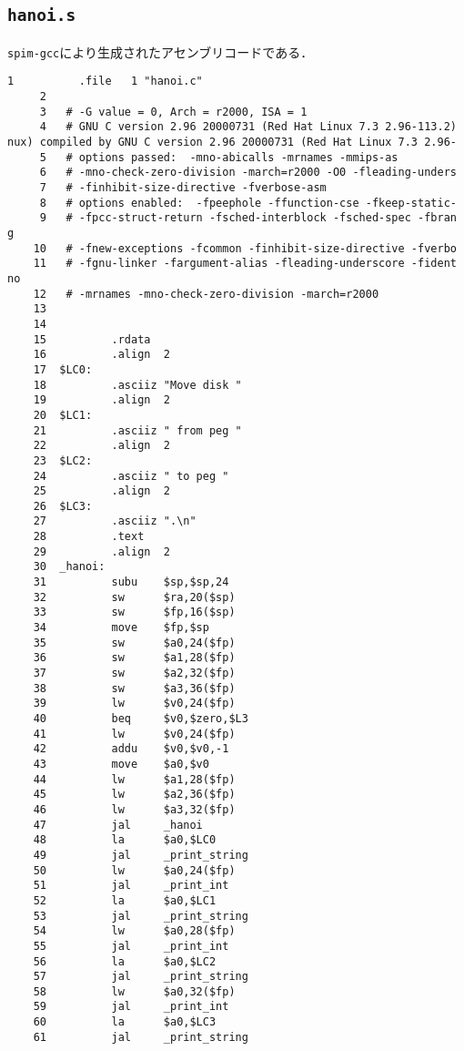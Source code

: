 \subsection{\texttt{hanoi.s}} \label{sec:hanoi.s}
\verb|spim-gcc|により生成されたアセンブリコードである．
\begin{Verbatim}[fontsize=\small, baselinestretch=0.8]
     1          .file   1 "hanoi.c"
     2
     3   # -G value = 0, Arch = r2000, ISA = 1
     4   # GNU C version 2.96 20000731 (Red Hat Linux 7.3 2.96-113.2)
nux) compiled by GNU C version 2.96 20000731 (Red Hat Linux 7.3 2.96-
     5   # options passed:  -mno-abicalls -mrnames -mmips-as
     6   # -mno-check-zero-division -march=r2000 -O0 -fleading-unders
     7   # -finhibit-size-directive -fverbose-asm
     8   # options enabled:  -fpeephole -ffunction-cse -fkeep-static-
     9   # -fpcc-struct-return -fsched-interblock -fsched-spec -fbran
g
    10   # -fnew-exceptions -fcommon -finhibit-size-directive -fverbo
    11   # -fgnu-linker -fargument-alias -fleading-underscore -fident
no
    12   # -mrnames -mno-check-zero-division -march=r2000
    13
    14
    15          .rdata
    16          .align  2
    17  $LC0:
    18          .asciiz "Move disk "
    19          .align  2
    20  $LC1:
    21          .asciiz " from peg "
    22          .align  2
    23  $LC2:
    24          .asciiz " to peg "
    25          .align  2
    26  $LC3:
    27          .asciiz ".\n"
    28          .text
    29          .align  2
    30  _hanoi:
    31          subu    $sp,$sp,24
    32          sw      $ra,20($sp)
    33          sw      $fp,16($sp)
    34          move    $fp,$sp
    35          sw      $a0,24($fp)
    36          sw      $a1,28($fp)
    37          sw      $a2,32($fp)
    38          sw      $a3,36($fp)
    39          lw      $v0,24($fp)
    40          beq     $v0,$zero,$L3
    41          lw      $v0,24($fp)
    42          addu    $v0,$v0,-1
    43          move    $a0,$v0
    44          lw      $a1,28($fp)
    45          lw      $a2,36($fp)
    46          lw      $a3,32($fp)
    47          jal     _hanoi
    48          la      $a0,$LC0
    49          jal     _print_string
    50          lw      $a0,24($fp)
    51          jal     _print_int
    52          la      $a0,$LC1
    53          jal     _print_string
    54          lw      $a0,28($fp)
    55          jal     _print_int
    56          la      $a0,$LC2
    57          jal     _print_string
    58          lw      $a0,32($fp)
    59          jal     _print_int
    60          la      $a0,$LC3
    61          jal     _print_string

\end{Verbatim}

